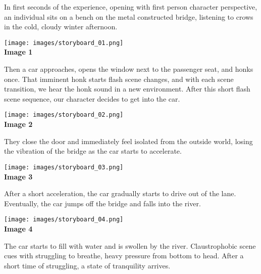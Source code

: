         In first seconds of the experience, opening with first person character perspective, an individual sits on a bench on the metal constructed bridge, listening to crows in the cold, cloudy winter afternoon.\par
 
        \begin{center}
            \texttt{[image: images/storyboard\_01.png]}\\
            \textbf{Image 1}
        \end{center}

        Then a car approaches, opens the window next to the passenger seat, and honks once. That imminent honk starts flash scene changes, and with each scene transition, we hear the honk sound in a new environment. After this short flash scene sequence, our character decides to get into the car.\par


        \begin{center}
            \texttt{[image: images/storyboard\_02.png]}\\
            \textbf{Image 2}
        \end{center}


        They close the door and immediately feel isolated from the outside world, losing the vibration of the bridge as the car starts to accelerate.\par

        \begin{center}
            \texttt{[image: images/storyboard\_03.png]}\\
            \textbf{Image 3}
        \end{center}

        After a short acceleration, the car gradually starts to drive out of the lane. Eventually, the car jumps off the bridge and falls into the river.\par

        \begin{center}
            \texttt{[image: images/storyboard\_04.png]}\\
            \textbf{Image 4}
        \end{center}

        The car starts to fill with water and is swollen by the river. Claustrophobic scene cues with struggling to breathe, heavy pressure from bottom to head. After a short time of struggling, a state of tranquility arrives.\par

